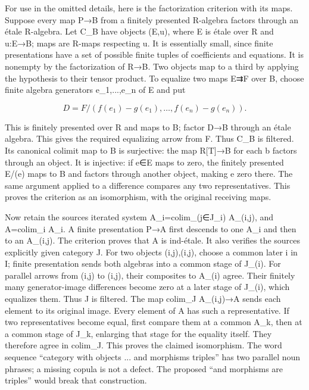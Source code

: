 For use in the omitted details, here is the factorization criterion with its maps. Suppose every map P→B from a finitely presented R-algebra factors through an étale R-algebra. Let C\_B have objects (E,u), where E is étale over R and u:E→B; maps are R-maps respecting u. It is essentially small, since finite presentations have a set of possible finite tuples of coefficients and equations. It is nonempty by the factorization of R→B. Two objects map to a third by applying the hypothesis to their tensor product. To equalize two maps E⇉F over B, choose finite algebra generators e\_1,...,e\_n of E and put

\[
D=F/(f(e_1)-g(e_1),\ldots,f(e_n)-g(e_n)).
\]

This is finitely presented over R and maps to B; factor D→B through an étale algebra. This gives the required equalizing arrow from F. Thus C\_B is filtered. Its canonical colimit map to B is surjective: the map R{[}T{]}→B for each b factors through an object. It is injective: if e∈E maps to zero, the finitely presented E/(e) maps to B and factors through another object, making e zero there. The same argument applied to a difference compares any two representatives. This proves the criterion as an isomorphism, with the original receiving maps.

Now retain the source\textquotesingle s iterated system A\_i=colim\_(j∈J\_i) A\_(i,j), and A=colim\_i A\_i. A finite presentation P→A first descends to one A\_i and then to an A\_(i,j). The criterion proves that A is ind-étale. It also verifies the source\textquotesingle s explicitly given category J. For two objects (i,j),(i\textquotesingle,j\textquotesingle), choose a common later i\textquotesingle\textquotesingle{} in I; finite presentation sends both algebras into a common stage of J\_(i\textquotesingle\textquotesingle). For parallel arrows from (i,j) to (i\textquotesingle,j\textquotesingle), their composites to A\_(i\textquotesingle) agree. Their finitely many generator-image differences become zero at a later stage of J\_(i\textquotesingle), which equalizes them. Thus J is filtered. The map colim\_J A\_(i,j)→A sends each element to its original image. Every element of A has such a representative. If two representatives become equal, first compare them at a common A\_k, then at a common stage of J\_k, enlarging that stage for the equality itself. They therefore agree in colim\_J. This proves the claimed isomorphism. The word sequence ``category with objects ... and morphisms triples'' has two parallel noun phrases; a missing copula is not a defect. The proposed ``and morphisms are triples'' would break that construction.

